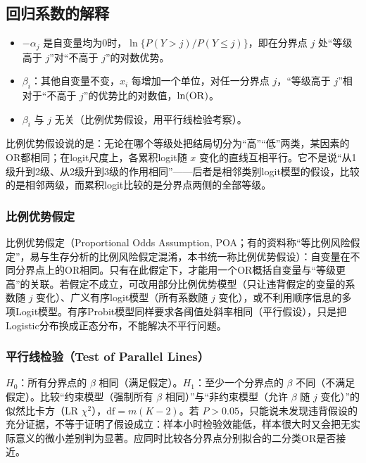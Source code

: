 \subsection{回归系数的解释}
\begin{itemize}
\item $-\alpha_j$ 是自变量均为0时，$\ln\{P(Y>j)/P(Y\le j)\}$，即在分界点 $j$ 处“等级高于 $j$”对“不高于 $j$”的对数优势。
\item $\beta_i$：其他自变量不变，$x_i$ 每增加一个单位，对任一分界点 $j$，“等级高于 $j$”相对于“不高于 $j$”的优势比的对数值，$\ln(\operatorname{OR})$。
\item $\beta_i$ 与 $j$ 无关（比例优势假设，用平行线检验考察）。
\end{itemize}
\begin{annotation}比例优势假设说的是：无论在哪个等级处把结局切分为“高”“低”两类，某因素的OR都相同；在logit尺度上，各累积logit随 $x$ 变化的直线互相平行。它不是说“从1级升到2级、从2级升到3级的作用相同”——后者是相邻类别logit模型的假设，比较的是相邻两级，而累积logit比较的是分界点两侧的全部等级。\end{annotation}
\subsubsection{比例优势假定}
比例优势假定（Proportional Odds Assumption, POA；有的资料称“等比例风险假定”，易与生存分析的比例风险假定混淆，本书统一称比例优势假设）：自变量在不同分界点上的OR相同。只有在此假定下，才能用一个OR概括自变量与“等级更高”的关联。若假定不成立，可改用部分比例优势模型（只让违背假定的变量的系数随 $j$ 变化）、广义有序logit模型（所有系数随 $j$ 变化），或不利用顺序信息的多项Logit模型。有序Probit模型同样要求各阈值处斜率相同（平行假设），只是把Logistic分布换成正态分布，不能解决不平行问题。
\subsubsection{平行线检验（Test of Parallel Lines）}
$H_0$：所有分界点的 $\beta$ 相同（满足假定）。$H_1$：至少一个分界点的 $\beta$ 不同（不满足假定）。比较“约束模型（强制所有 $\beta$ 相同）”与“非约束模型（允许 $\beta$ 随 $j$ 变化）”的似然比卡方（LR $\chi^2$），$\mathrm{df}=m(K-2)$。若 $P>0.05$，只能说未发现违背假设的充分证据，不等于证明了假设成立：样本小时检验效能低，样本很大时又会把无实际意义的微小差别判为显著。应同时比较各分界点分别拟合的二分类OR是否接近。
